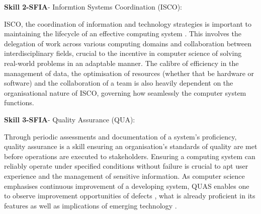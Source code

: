 \documentclass[a4paper, 11pt]{report}
\begin{document}
\textbf{Skill 2-SFIA}- Informtion Systems Coordination (ISCO):

ISCO, the coordination of information and technology strategies is important to maintaining the lifecycle of an effective computing system \cite{isco}. This involves the delegation of work across various computing domains and collaboration between interdisciplinary fields, crucial to the incentive in computer science of solving real-world problems in an adaptable manner. The calibre of efficiency in the management of data, the optimisation of resources \cite{gupta} (whether that be hardware or software) and the collaboration of a team is also heavily dependent on the organisational nature of ISCO, governing how seamlessly the computer system functions.

\textbf{Skill 3-SFIA}- Quality Assurance (QUA):

Through periodic assessments and documentation \cite{quas} of  a system’s proficiency, quality assurance is a skill ensuring an organisation’s standards of quality are met \cite{quas} before operations are executed to stakeholders. Ensuring a computing system can reliably operate under specified conditions without failure is crucial to apt user experience and the management of sensitive information. As computer science emphasises continuous improvement of a developing system, QUAS enables one to observe improvement opportunities of defects \cite{isco}, what is already proficient in its features as well as implications of emerging technology \cite{quas}.
\end{document}

